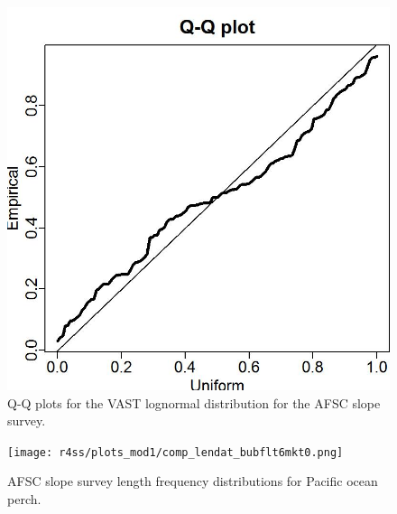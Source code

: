 \documentclass[12pt,]{article}
\begin{document}
\FloatBarrier

\begin{figure}
\centering
\includegraphics{Figures/Q-Q_plot_afsc.jpg}
\caption{Q-Q plots for the VAST lognormal distribution for the AFSC
slope survey. \label{fig:afsc_qq}}
\end{figure}

\FloatBarrier

\begin{figure}
\centering
\texttt{[image: r4ss/plots\_mod1/comp\_lendat\_bubflt6mkt0.png]}
\caption{AFSC slope survey length frequency distributions for Pacific
ocean perch. \label{fig:afsc_Length}}
\end{figure}

\FloatBarrier
\end{document}
